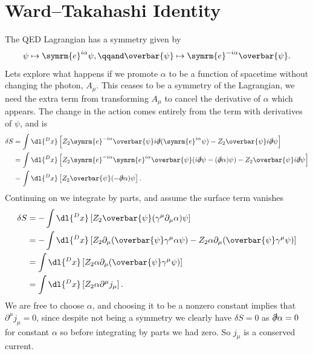 \documentclass[fleqn]{NotesClass}
\newcommand{\e}{\symrm{e}}
\newcommand{\diracadjoint}[1]{\overbar{#1}}
\begin{document}
    \section{Ward--Takahashi Identity}
    The QED Lagrangian has a symmetry given by
    \begin{equation}
        \psi \mapsto \e^{i\alpha}\psi, \qqand \diracadjoint{\psi} \mapsto \e^{-i\alpha}\diracadjoint{\psi}.
    \end{equation}
    Lets explore what happens if we promote \(\alpha\) to be a function of spacetime without changing the photon, \(A_\mu\).
    This ceases to be a symmetry of the Lagrangian, we need the extra term from transforming \(A_\mu\) to cancel the derivative of \(\alpha\) which appears.
    The change in the action comes entirely from the term with derivatives of \(\psi\), and is
    \begin{align}
        \delta S &= \int \dl{^Dx} \left[ Z_2 \e^{-i\alpha}\diracadjoint{\psi}i\slashed{\partial}(\e^{i\alpha}\psi) - Z_2 \diracadjoint{\psi}i\slashed{\partial}\psi \right]\\
        &= \int \dl{^Dx} \left[ Z_2 \e^{-i\alpha}\e^{i\alpha}\diracadjoint{\psi}(i\slashed{\partial}\psi - (\slashed{\partial}\alpha)\psi) - Z_2\diracadjoint{\psi}i\slashed{\partial}\psi \right]\\
        &= \int \dl{^Dx}\left[ Z_2 \diracadjoint{\psi}(-\slashed{\partial}\alpha) \psi \right].
    \end{align}
    Continuing on we integrate by parts, and assume the surface term vanishes
    \begin{align}
        \delta S &= -\int \dl{^Dx} \left[ Z_2 \diracadjoint{\psi}(\gamma^\mu \partial_\mu \alpha)\psi \right]\\
        &= -\int \dl{^Dx} \left[ Z_2 \partial_\mu (\diracadjoint{\psi}\gamma^\mu \alpha \psi) - Z_2 \alpha \partial_\mu (\diracadjoint{\psi} \gamma^\mu \psi) \right]\\
        &= \int \dl{^Dx} \left[ Z_2 \alpha \partial_\mu (\diracadjoint{\psi} \gamma^\mu \psi) \right]\\
        &= \int \dl{^Dx} \left[ Z_2 \alpha \partial^\mu j_\mu \right].
    \end{align}
    We are free to choose \(\alpha\), and choosing it to be a nonzero constant implies that \(\partial^\mu j_\mu = 0\), since despite not being a symmetry we clearly have \(\delta S = 0\) as \(\slashed{\partial} \alpha = 0\) for constant \(\alpha\) so before integrating by parts we had zero.
    So \(j_\mu\) is a conserved current.
    
\end{document}
